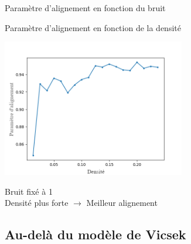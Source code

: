 \documentclass[aspectratio=43, a4paper, 12pt]{beamer}
\begin{document}
\begin{frame}{Paramètre d'alignement en fonction du bruit}

\end{frame}

\begin{frame}{Paramètre d'alignement en fonction de la densité}
   \begin{center}\includegraphics[width=8cm]{images/densite_1[noise=1]2.png}\end{center}
   \begin{center} Bruit fixé à 1 \\ Densité plus forte $\rightarrow$ Meilleur alignement \end{center}
\end{frame}

\subsection{Au-delà du modèle de Vicsek}
\begin{frame}
\end{frame}
\end{document}
